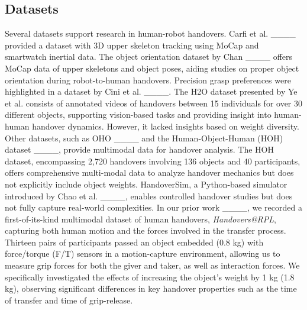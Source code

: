 \subsection{Datasets}
Several datasets support research in human-robot handovers. Carfi et al. ____ provided a dataset with 3D upper skeleton tracking using MoCap and smartwatch inertial data. The object orientation dataset by Chan ____ offers MoCap data of upper skeletons and object poses, aiding studies on proper object orientation during robot-to-human handovers. Precision grasp preferences were highlighted in a dataset by Cini et al. ____. The H2O dataset presented by Ye et al. consists of annotated videos of handovers between 15 individuals for over 30 different objects, supporting vision-based tasks and providing insight into human-human handover dynamics. However, it lacked insights based on weight diversity. Other datasets, such as OHO ____ and the Human-Object-Human (HOH) dataset ____, provide multimodal data for handover analysis. The HOH dataset, encompassing 2,720 handovers involving 136 objects and 40 participants, offers comprehensive multi-modal data to analyze handover mechanics but does not explicitly include object weights. HandoverSim, a Python-based simulator introduced by Chao et al. ____, enables controlled handover studies but does not fully capture real-world complexities. 
In our prior work ____, we recorded a first-of-its-kind multimodal dataset of human handovers, \textit{Handovers@RPL},  capturing both human motion and the forces involved in the transfer process. Thirteen pairs of participants passed an object embedded (0.8 kg) with force/torque (F/T) sensors in a motion-capture environment, allowing us to measure grip forces for both the giver and taker, as well as interaction forces. We specifically investigated the effects of increasing the object's weight by 1 kg (1.8 kg), observing significant differences in key handover properties such as the time of transfer and time of grip-release.



